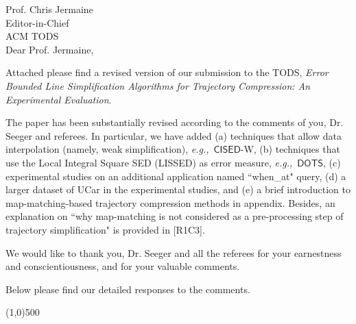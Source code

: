 \documentclass{letter}
\newcommand{\kw}[1]{{\ensuremath {\mathsf{#1}}}\xspace}
\newcommand{\eg}{\emph{e.g.,}\xspace}
\begin{document}
Prof. {Chris Jermaine} \\
Editor-in-Chief		\\
ACM TODS	\\



Dear Prof. Jermaine,

Attached please find a revised version of our submission to
the TODS, \emph{Error Bounded Line Simplification Algorithms for Trajectory Compression: An Experimental Evaluation}.




The paper has been substantially revised according to the comments of you, Dr. Seeger and referees. In particular, we have added{
	(a) techniques that allow data interpolation (namely, weak simplification), \eg~\kw{CISED}-{W},
	(b) techniques that use the Local Integral Square SED (LISSED) as error measure,  \eg~\kw{DOTS},
	(c) experimental studies on an additional application named ``when\_at" query, 
	(d) a larger dataset of UCar in the experimental studies, and
	(e) a brief introduction to map-matching-based trajectory compression methods in appendix.}
Besides, an explanation on ``why map-matching is not considered as a pre-processing step of trajectory simplification" is provided in {[R1C3]}.


We would like to thank you, Dr. Seeger and all the referees for your earnestness and conscientiousness, and for your valuable comments.

Below please find our detailed responses to the comments.



\line(1,0){500}
\end{document}

